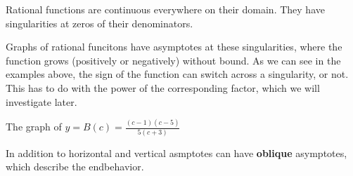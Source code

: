 \documentclass{ximera}
\begin{document}
Rational functions are continuous everywhere on their domain.  They have singularities at zeros of their denominators.  

Graphs of rational funcitons have asymptotes at these singularities, where the function grows (positively or negatively) without bound.  As we can see in the examples above, the sign of the function can switch across a singularity, or not.  This has to do with the power of the corresponding factor, which we will investigate later.













\begin{example}


The graph of $y = B(c) = \frac{(c-1)(c-5)}{5(c+3)} $


\begin{image}
\end{image}

\end{example}




In addition to horizontal and vertical asmptotes can have \textbf{oblique} asymptotes, which describe the endbehavior.
\end{document}
